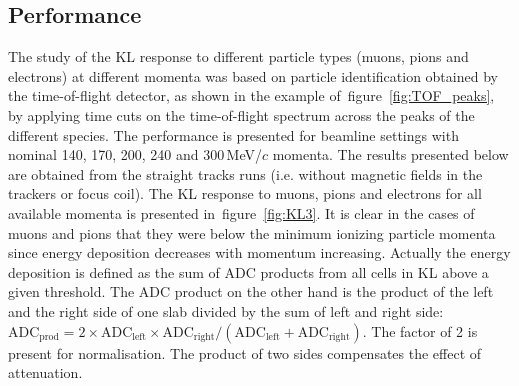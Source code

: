 \subsection{Performance}
\label{SubSect:KL_Performance}

The study of the KL response to different particle types (muons, pions and electrons) at different momenta was based on particle identification obtained by the time-of-flight detector, as shown in the example of~figure~\ref{fig:TOF_peaks}, by applying time cuts on the time-of-flight spectrum across the peaks of the different species. The performance is presented for beamline settings with nominal 140, 170, 200, 240 and 300\,MeV/$c$ momenta. The results presented below are obtained from the straight tracks runs (i.e. without magnetic fields in the trackers or focus coil). The KL response to muons, pions and electrons for all available momenta is presented in~figure~\ref{fig:KL3}. It is clear in the cases of muons and pions that they were below the minimum ionizing particle momenta since energy deposition decreases with momentum increasing. Actually the energy deposition is defined as the sum of ADC products from all cells in KL above a given threshold. The ADC product on the other hand is the product of the left and the right side of one slab divided by the sum of left and right side: $\text{ADC}_{\text{prod}} = 2 \times \text{ADC}_{\text{left}} \times \text{ADC}_{\text{right}} / (\text{ADC}_{\text{left}} + \text{ADC}_{\text{right}})$. The factor of 2 is present for normalisation. The product of two sides compensates the effect of attenuation.
